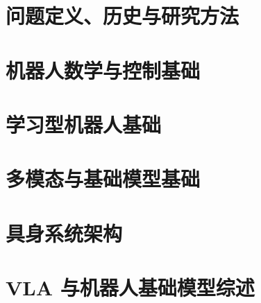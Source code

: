 \part{问题定义、历史与研究方法}




\part{机器人数学与控制基础}






\part{学习型机器人基础}






\part{多模态与基础模型基础}





\part{具身系统架构}





\part{VLA 与机器人基础模型综述}





